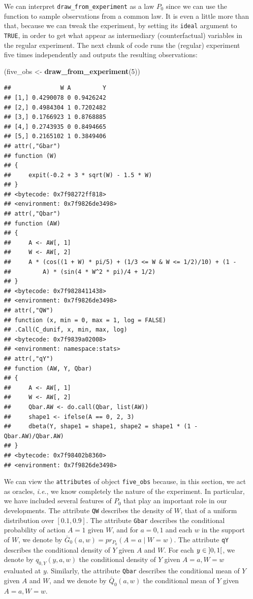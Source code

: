 \documentclass[]{article}
\newenvironment{Shaded}{\begin{snugshade}}{\end{snugshade}}
\newcommand{\DecValTok}[1]{\textcolor[rgb]{0.00,0.00,0.81}{#1}}
\newcommand{\KeywordTok}[1]{\textcolor[rgb]{0.13,0.29,0.53}{\textbf{#1}}}
\newcommand{\NormalTok}[1]{#1}
\newcommand{\StringTok}[1]{\textcolor[rgb]{0.31,0.60,0.02}{#1}}
\newcommand{\Gbar}{\bar{G}}
\newcommand{\Qbar}{\bar{Q}}
\theoremstyle{definition}
\theoremstyle{definition}
\theoremstyle{definition}
\theoremstyle{remark}
\begin{document}
We can interpret \texttt{draw\_from\_experiment} as a law \(P_{0}\)
since we can use the function to sample observations from a common law.
It is even a little more than that, because we can tweak the experiment,
by setting its \texttt{ideal} argument to \texttt{TRUE}, in order to get
what appear as intermediary (counterfactual) variables in the regular
experiment. The next chunk of code runs the (regular) experiment five
times independently and outputs the resulting observations:

\begin{Shaded}
\begin{Highlighting}[]
\NormalTok{(five_obs <-}\StringTok{ }\KeywordTok{draw_from_experiment}\NormalTok{(}\DecValTok{5}\NormalTok{))}
\end{Highlighting}
\end{Shaded}

\begin{verbatim}
##              W A         Y
## [1,] 0.4290078 0 0.9426242
## [2,] 0.4984304 1 0.7202482
## [3,] 0.1766923 1 0.8768885
## [4,] 0.2743935 0 0.8494665
## [5,] 0.2165102 1 0.3849406
## attr(,"Gbar")
## function (W) 
## {
##     expit(-0.2 + 3 * sqrt(W) - 1.5 * W)
## }
## <bytecode: 0x7f98272ff818>
## <environment: 0x7f9826de3498>
## attr(,"Qbar")
## function (AW) 
## {
##     A <- AW[, 1]
##     W <- AW[, 2]
##     A * (cos((1 + W) * pi/5) + (1/3 <= W & W <= 1/2)/10) + (1 - 
##         A) * (sin(4 * W^2 * pi)/4 + 1/2)
## }
## <bytecode: 0x7f9828411438>
## <environment: 0x7f9826de3498>
## attr(,"QW")
## function (x, min = 0, max = 1, log = FALSE) 
## .Call(C_dunif, x, min, max, log)
## <bytecode: 0x7f9839a02008>
## <environment: namespace:stats>
## attr(,"qY")
## function (AW, Y, Qbar) 
## {
##     A <- AW[, 1]
##     W <- AW[, 2]
##     Qbar.AW <- do.call(Qbar, list(AW))
##     shape1 <- ifelse(A == 0, 2, 3)
##     dbeta(Y, shape1 = shape1, shape2 = shape1 * (1 - Qbar.AW)/Qbar.AW)
## }
## <bytecode: 0x7f98402b8360>
## <environment: 0x7f9826de3498>
\end{verbatim}

We can view the \texttt{attributes} of object \texttt{five\_obs}
because, in this section, we act as oracles, \textit{i.e.}, we know
completely the nature of the experiment. In particular, we have included
several features of \(P_0\) that play an important role in our
developments. The attribute \texttt{QW} describes the density of \(W\),
that of a uniform distribution over \([0.1, 0.9]\). The attribute
\texttt{Gbar} describes the conditional probability of action \(A = 1\)
given \(W\), and for \(a = 0,1\) and each \(w\) in the support of \(W\),
we denote by \(\Gbar_0(a,w) = pr_{P_0}(A = a \mid W = w)\). The
attribute \texttt{qY} describes the conditional density of \(Y\) given
\(A\) and \(W\). For each \(y\in \interval[open]{0}{1}\), we denote by
\(q_{0,Y}(y, a, w)\) the conditional density of \(Y\) given
\(A = a, W = w\) evaluated at \(y\). Similarly, the attribute
\texttt{Qbar} describes the conditional mean of \(Y\) given \(A\) and
\(W\), and we denote by \(\Qbar_0(a,w)\) the conditional mean of \(Y\)
given \(A = a, W = w\).
\end{document}
